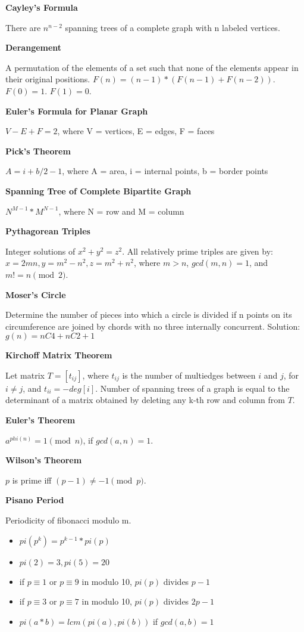 \textbf{Cayley's Formula}

There are $n^{n-2}$ spanning trees of a complete graph with n labeled vertices.

\bigbreak
\textbf{Derangement}

A permutation of the elements of a set such that none of the elements appear in their original positions. $F(n) = (n-1) * (F(n-1) + F(n-2))$. $F(0) = 1$. $F(1) = 0$.

\bigbreak
\textbf{Euler’s Formula for Planar Graph}

$V - E + F = 2$, where V = vertices, E = edges, F = faces

\bigbreak
\textbf{Pick’s Theorem}

$A = i + b/2 - 1$, where A = area, i = internal points, b = border points

\bigbreak
\textbf{Spanning Tree of Complete Bipartite Graph}

$N^{M-1} * M^{N-1}$, where N = row and M = column

\bigbreak
\textbf{Pythagorean Triples}

Integer solutions of $x^2 + y^2 = z^2$. All relatively prime triples are given by: $x = 2mn, y = m^2 - n^2, z = m^2 + n^2$, where $m > n$, $gcd(m, n) = 1$, and $m != n \pmod{2}$.

\bigbreak
\textbf{Moser’s Circle}

Determine the number of pieces into which a circle is divided if n points on its circumference are joined by chords with no three internally concurrent. Solution: $g(n) = nC4 + nC2 + 1$

\bigbreak
\textbf{Kirchoff Matrix Theorem}

Let matrix $T = [t_{ij}]$, where $t_{ij}$ is the number of multiedges between $i$ and $j$, for $i \neq j$, and $t_{ii} = -deg[i]$. Number of spanning trees of a graph is equal to the determinant of a matrix obtained by deleting any k-th row and column from $T$.

\bigbreak
\textbf{Euler's Theorem}

$a^{phi(n)} = 1 \pmod{n}$, if $gcd(a, n) = 1$. 

\bigbreak
\textbf{Wilson's Theorem} 

$p$ is prime iff $(p-1) \neq -1 \pmod{p}$.

\bigbreak
\textbf{Pisano Period}

Periodicity of fibonacci modulo m.

\begin{itemize}
    \item $pi(p^{k}) = p^{k-1} * pi(p)$
    \item $pi(2) = 3, pi(5) = 20$
    \item if $p \equiv 1$ or $p \equiv 9$ in modulo 10, $pi(p)$ divides $p-1$
    \item if $p \equiv 3$ or $p \equiv 7$ in modulo 10, $pi(p)$ divides $2p-1$
    \item $pi(a * b) = lcm(pi(a), pi(b))$ if $gcd(a, b) = 1$
\end{itemize}

